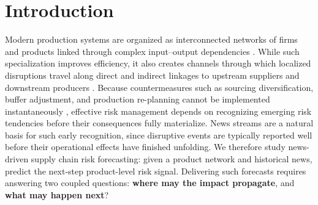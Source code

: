 
\section{Introduction}

Modern production systems are organized as interconnected networks of firms and products linked through complex input--output dependencies \cite{baldwin2022risks,elliott2022supply}. While such specialization improves efficiency, it also creates channels through which localized disruptions travel along direct and indirect linkages to upstream suppliers and downstream producers \cite{elliott2022supply,grossman2023resilience,lafrogne2023supply,demir2024financial,meier2024covid}. Because countermeasures such as sourcing diversification, buffer adjustment, and production re-planning cannot be implemented instantaneously \cite{grossman2023resilience,lafrogne2023supply}, effective risk management depends on recognizing emerging risk tendencies before their consequences fully materialize. News streams are a natural basis for such early recognition, since disruptive events are typically reported well before their operational effects have finished unfolding. We therefore study news-driven supply chain risk forecasting: given a product network and historical news, predict the next-step product-level risk signal. Delivering such forecasts requires answering two coupled questions: \textbf{where may the impact propagate}, and \textbf{what may happen next}?

